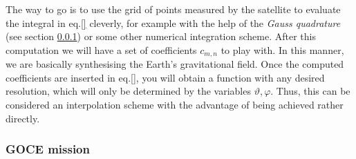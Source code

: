 The way to go is to use the grid of points measured by the satellite to evaluate the integral in eq.\eqref{} cleverly, for example with the help of 
the \emph{Gauss quadrature} (see section \ref{}) or some other numerical integration scheme. After this computation we will have a set of 
coefficients $c_{m,n}$ to play with. In this manner, we are basically synthesising the Earth's gravitational field. Once the computed coefficients are 
inserted in eq.\eqref{}, you will obtain a function with any desired resolution, which will only be determined by the variables $\vartheta, \varphi$. Thus, this can
be considered an interpolation scheme with the advantage of being achieved rather directly.


\subsubsection{GOCE mission}


